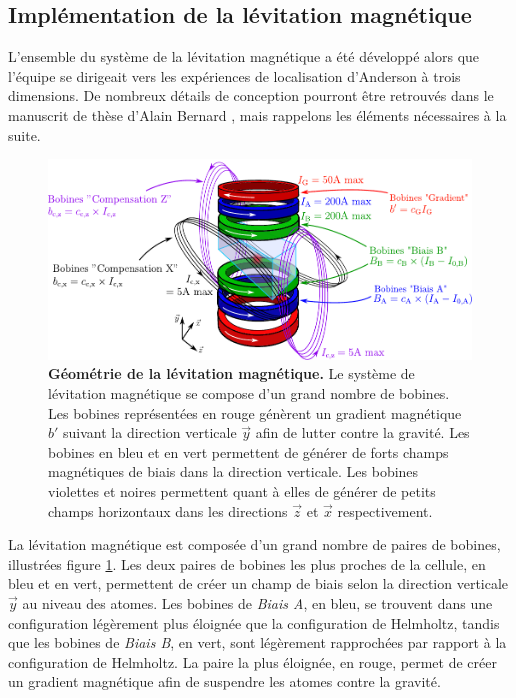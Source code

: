 \subsection{Implémentation de la lévitation magnétique}
\label{sc:implementation_levitation}
L'ensemble du système de la lévitation magnétique a été développé alors que l'équipe se dirigeait vers les expériences de localisation d'Anderson à trois dimensions. De nombreux détails de conception pourront être retrouvés dans le manuscrit de thèse d'Alain Bernard \citep{bernard2010transport}, mais rappelons les éléments nécessaires à la suite.


\begin{figure}
\centering
\includegraphics[width=\textwidth]{Fig/modif_exp/geometrie_levitation.pdf}
\caption{\textbf{Géométrie de la lévitation magnétique.} Le système de lévitation magnétique se compose d'un grand nombre de bobines. Les bobines représentées en rouge génèrent un gradient magnétique $b'$ suivant la direction verticale $\vec{y}$ afin de lutter contre la gravité. Les bobines en bleu et en vert permettent de générer de forts champs magnétiques de biais dans la direction verticale. Les bobines violettes et noires permettent quant à elles de générer de petits champs horizontaux dans les directions $\vec{z}$ et $\vec{x}$ respectivement.}
\label{fig:geometrie_levitation}
\end{figure}

La lévitation magnétique est composée d'un grand nombre de paires de bobines, illustrées figure \ref{fig:geometrie_levitation}. Les deux paires de bobines les plus proches de la cellule, en bleu et en vert, permettent de créer un champ de biais selon la direction verticale $\vec{y}$ au niveau des atomes. Les bobines de \emph{Biais A}, en bleu, se trouvent dans une configuration légèrement plus éloignée que la configuration de Helmholtz, tandis que les bobines de \emph{Biais B}, en vert, sont légèrement rapprochées par rapport à la configuration de Helmholtz. La paire la plus éloignée, en rouge, permet de créer un gradient magnétique afin de suspendre les atomes contre la gravité. 

